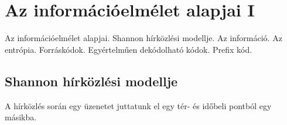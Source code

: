 \documentclass[../main.tex]{subfiles}
\begin{document}
\section{Az információelmélet alapjai I}

\begin{fulltheorem}
	Az információelmélet alapjai. Shannon hírközlési modellje. Az információ.
	Az entrópia. Forráskódok. Egyértelműen dekódolható kódok. Prefix kód.
\end{fulltheorem}

\subsection{Shannon hírközlési modellje}

A hírközlés során egy üzenetet juttatunk el
egy tér- és időbeli pontból egy másikba.
\end{document}
